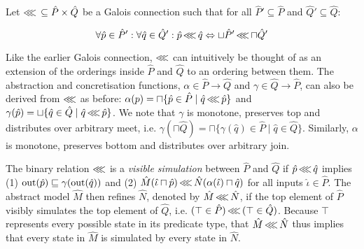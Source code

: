 



Let $\operatorname{\lll} \, \subseteq \hat P \times \hat Q$ be a Galois connection such that for all $\hat P' \subseteq \hat P$ and $\hat Q' \subseteq \hat Q$:

\begin{equation*}
\forall \hat p \in \hat P' : \forall \hat q \in \hat Q' : \hat p \operatorname{\lll} \hat q \Leftrightarrow \sqcup \hat P' \operatorname{\lll} \sqcap \hat Q'
\end{equation*}

\noindent Like the earlier Galois connection, $\operatorname{\lll}$ can intuitively be thought of as an extension of the orderings inside $\hat P$ and $\hat Q$ to an ordering between them. The abstraction and concretisation functions, $\alpha \in \hat P \rightarrow \hat Q$ and $\gamma \in \hat Q \rightarrow \hat P$, can also be derived from $\operatorname{\lll}$ as before: $\alpha(p) = \sqcap \{ \hat p \in \hat P \mid \hat q \operatorname{\lll} \hat p \}$ and $\gamma(\hat p) = \sqcup \{ \hat q \in \hat Q \mid \hat q \operatorname{\lll} \hat p \}$. We note that $\gamma$ is monotone, preserves top and distributes over arbitrary meet, i.e. $\gamma(\sqcap \hat Q) = \sqcap \{ \gamma(\hat q) \in \hat P \mid \hat q \in \hat Q\}$. Similarly, $\alpha$ is monotone, preserves bottom and distributes over arbitrary join.

The binary relation $\operatorname{\lll}$ is a \textit{visible simulation} between $\hat P$ and $\hat Q$ if $\hat p \operatorname{\lll} \hat q$ implies (1) $\operatorname{out}(\hat p) \sqsubseteq \gamma(\operatorname{out}(\hat q))$ and (2) $\hat M(\hat \iota \sqcap \hat p) \operatorname{\lll} \hat N(\alpha(\hat \iota) \sqcap \hat q)$ for all inputs $\hat \iota \in \hat P$. The abstract model $\hat M$ then refines $\hat N$, denoted by $\hat M \operatorname{\lll} \hat N$, if the top element of $\hat P$ visibly simulates the top element of $\hat Q$, i.e. $(\top \in \hat P) \operatorname{\lll} \, (\top \in \hat Q)$. Because $\top$ represents every possible state in its predicate type, that $\hat M \operatorname{\lll} \hat N$ thus implies that every state in $\hat M$ is simulated by every state in $\hat N$. 

